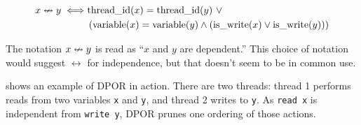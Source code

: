 \begin{align*}
  x \nleftrightarrow y \iff& \mathrm{thread\_id}(x) = \mathrm{thread\_id}(y)~\lor\\
    &\left(\mathrm{variable}(x) = \mathrm{variable}(y)
     \land \left(\mathrm{is\_write}(x) \lor \mathrm{is\_write}(y)\right)\right)
\end{align*}

The notation $x \nleftrightarrow y$ is read as ``$x$ and $y$ are
dependent.''  This choice of notation would suggest $\leftrightarrow$
for independence, but that doesn't seem to be in common use.

 shows an example of DPOR in action.  There are two
threads: thread 1 performs reads from two variables \verb|x| and
\verb|y|, and thread 2 writes to \verb|y|.  As \verb|read x| is
independent from \verb|write y|, DPOR prunes one ordering of those
actions.

